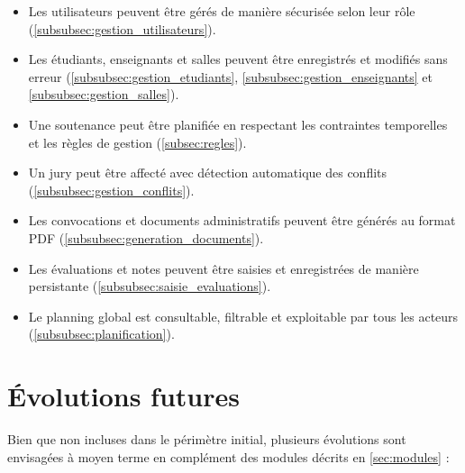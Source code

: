 \documentclass[12pt,a4paper]{article}
\begin{document}
\begin{itemize}[label=\textcolor{primary}{\textbullet}, leftmargin=1.5cm]
    \item Les utilisateurs peuvent être gérés de manière sécurisée selon leur
          rôle (\ref{subsubsec:gestion_utilisateurs}).
    \item Les étudiants, enseignants et salles peuvent être enregistrés et
          modifiés sans erreur (\ref{subsubsec:gestion_etudiants}, \ref{subsubsec:gestion_enseignants} et \ref{subsubsec:gestion_salles}).
    \item Une soutenance peut être planifiée en respectant les contraintes
          temporelles et les règles de gestion (\ref{subsec:regles}).
    \item Un jury peut être affecté avec détection automatique des conflits
          (\ref{subsubsec:gestion_conflits}).
    \item Les convocations et documents administratifs peuvent être générés au
          format PDF (\ref{subsubsec:generation_documents}).
    \item Les évaluations et notes peuvent être saisies et enregistrées de
          manière persistante (\ref{subsubsec:saisie_evaluations}).
    \item Le planning global est consultable, filtrable et exploitable par tous
          les acteurs (\ref{subsubsec:planification}).
\end{itemize}

\section{Évolutions futures}
\label{sec:evolutions}

Bien que non incluses dans le périmètre initial, plusieurs évolutions sont
envisagées à moyen terme en complément des modules décrits en \ref{sec:modules} :
\end{document}
